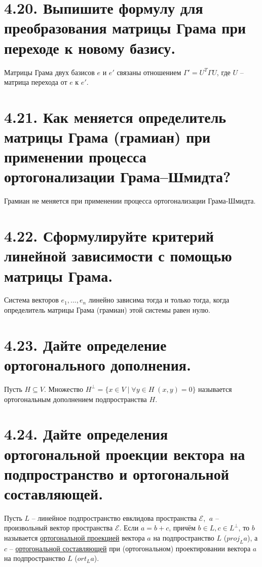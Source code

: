 \documentclass{article}
\begin{document}
\section*{\LARGE 4.20. Выпишите формулу для преобразования матрицы Грама при переходе к новому базису.}
Матрицы Грама двух базисов $e$ и $e'$ связаны отношением $\Gamma' = U^T \Gamma U$, где $U$ -- матрица перехода от $e$ к $e'$.

\section*{\LARGE 4.21. Как меняется определитель матрицы Грама (грамиан) при применении процесса ортогонализации Грама–Шмидта? }
Грамиан не меняется при применении процесса ортогонализации Грама-Шмидта.

\section*{\LARGE 4.22. Сформулируйте критерий линейной зависимости с помощью матрицы Грама.}
Система векторов $e_1, ... , e_n$ линейно зависима тогда и только тогда, когда определитель матрицы Грама (грамиан) этой системы равен нулю.

\section*{\LARGE 4.23. Дайте определение ортогонального дополнения.}
Пусть $H \subseteq V$. Множество $H^{\perp} = \{x \in V \;|\;\forall y \in H \; (x, y) = 0\}$ называется ортогональным дополнением подпространства $H$.

\section*{\LARGE 4.24. Дайте определения ортогональной проекции вектора на подпространство и ортогональной составляющей.}
Пусть $L$ -- линейное подпространство евклидова пространства $\mathcal{E}$, $\: a$ -- произвольный вектор пространства $\mathcal{E}$. Если $a = b + c$, причём $b \in L, c \in L^\perp$, то $b$ называется \underline{ортогональной проекцией} вектора $a$ на подпространство $L$ ($proj_L a$), а $c$ -- \underline{ортогональной составляющей} при (ортогональном) проектировании вектора $a$ на подпространство $L$ ($ort_L a$). 
\end{document}
